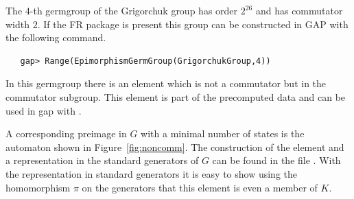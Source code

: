 \documentclass[a4paper,11pt]{amsart}
\begin{document}
The $4$-th germgroup of the Grigorchuk group has order $2^{26}$ and has commutator width $2$.
If the FR package is present this group can be constructed in GAP with 
the following command. 
\begin{lstlisting}
   gap> Range(EpimorphismGermGroup(GrigorchukGroup,4))
\end{lstlisting}
In this germgroup there is an element which is not a commutator 
but in the commutator subgroup. This element is part of the
precomputed data and can be used in gap with
.	

 A corresponding preimage in $G$ with a minimal number of states is the automaton shown in Figure~\ref{fig:noncomm}. 
The construction of the element and a representation in the standard generators of $G$ can be found in the file
 . With the representation in standard generators it is easy to show using the 
 homomorphism $\pi$ on the generators that this element is even a member of $K$.
\end{document}
